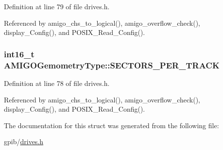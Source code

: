 Definition at line 79 of file drives.\+h.



Referenced by amigo\+\_\+chs\+\_\+to\+\_\+logical(), amigo\+\_\+overflow\+\_\+check(), display\+\_\+\+Config(), and P\+O\+S\+I\+X\+\_\+\+Read\+\_\+\+Config().

\subsubsection[{\texorpdfstring{S\+E\+C\+T\+O\+R\+S\+\_\+\+P\+E\+R\+\_\+\+T\+R\+A\+CK}{SECTORS_PER_TRACK}}]{\setlength{\rightskip}{0pt plus 5cm}int16\+\_\+t A\+M\+I\+G\+O\+Gemometry\+Type\+::\+S\+E\+C\+T\+O\+R\+S\+\_\+\+P\+E\+R\+\_\+\+T\+R\+A\+CK}\hypertarget{structAMIGOGemometryType_a9ac647c76bd331ab5b1fd22a4f5b9a4a}{}\label{structAMIGOGemometryType_a9ac647c76bd331ab5b1fd22a4f5b9a4a}


Definition at line 78 of file drives.\+h.



Referenced by amigo\+\_\+chs\+\_\+to\+\_\+logical(), amigo\+\_\+overflow\+\_\+check(), display\+\_\+\+Config(), and P\+O\+S\+I\+X\+\_\+\+Read\+\_\+\+Config().



The documentation for this struct was generated from the following file\+:\begin{DoxyCompactItemize}
\item 
gpib/\hyperlink{drives_8h}{drives.\+h}\end{DoxyCompactItemize}
